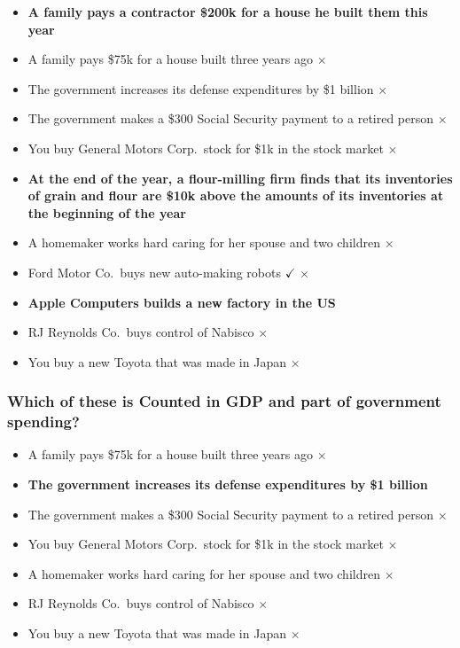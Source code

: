 \documentclass[
  letterpaper,
  DIV=11,
  numbers=noendperiod]{scrartcl}
\providecommand{\tightlist}{%
  \setlength{\itemsep}{0pt}\setlength{\parskip}{0pt}}\usepackage{longtable,booktabs,array}
\begin{document}
\begin{itemize}
\tightlist
\item
  \textbf{A family pays a contractor \$200k for a house he built them
  this year}
\item
  A family pays \$75k for a house built three years ago \(\times\)
\item
  The government increases its defense expenditures by \$1 billion
  \(\times\)
\item
  The government makes a \$300 Social Security payment to a retired
  person \(\times\)
\item
  You buy General Motors Corp.~stock for \$1k in the stock market
  \(\times\)
\item
  \textbf{At the end of the year, a flour-milling firm finds that its
  inventories of grain and flour are \$10k above the amounts of its
  inventories at the beginning of the year}
\item
  A homemaker works hard caring for her spouse and two children
  \(\times\)
\item
  Ford Motor Co.~buys new auto-making robots \(\checkmark\) \(\times\)
\item
  \textbf{Apple Computers builds a new factory in the US}
\item
  RJ Reynolds Co.~buys control of Nabisco \(\times\)
\item
  You buy a new Toyota that was made in Japan \(\times\)
\end{itemize}

\subsubsection{Which of these is Counted in GDP and part of government
spending?}\label{which-of-these-is-counted-in-gdp-and-part-of-government-spending}

\begin{itemize}
\tightlist
\item
  A family pays \$75k for a house built three years ago \(\times\)
\item
  \textbf{The government increases its defense expenditures by \$1
  billion}
\item
  The government makes a \$300 Social Security payment to a retired
  person \(\times\)
\item
  You buy General Motors Corp.~stock for \$1k in the stock market
  \(\times\)
\item
  A homemaker works hard caring for her spouse and two children
  \(\times\)
\item
  RJ Reynolds Co.~buys control of Nabisco \(\times\)
\item
  You buy a new Toyota that was made in Japan \(\times\)
\end{itemize}
\end{document}

